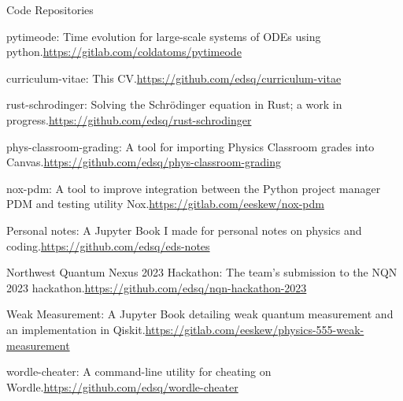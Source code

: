 \begingroup  %

\newcommand{\repo}[3]{\entry*#1: #2\newline\url{#3}}


\begin{rubric}{Code Repositories}



    \repo{pytimeode}
        {Time evolution for large-scale systems of ODEs using python.}
        {https://gitlab.com/coldatoms/pytimeode}

    \repo{curriculum-vitae}
        {This CV.}
        {https://github.com/edsq/curriculum-vitae}

    \repo{rust-schrodinger}
        {Solving the Schr\"{o}dinger equation in Rust; a work in progress.}
        {https://github.com/edsq/rust-schrodinger}

    \repo{phys-classroom-grading}
        {A tool for importing Physics Classroom grades into Canvas.}
        {https://github.com/edsq/phys-classroom-grading}

    \repo{nox-pdm}
        {A tool to improve integration between the Python project manager PDM
        and testing utility Nox.}
        {https://gitlab.com/eeskew/nox-pdm}

    \repo{Personal notes}
        {A Jupyter Book I made for personal notes on physics and coding.}
        {https://github.com/edsq/eds-notes}

    \repo{Northwest Quantum Nexus 2023 Hackathon}
        {The \smc{WSU} team's submission to the NQN 2023 hackathon.}
        {https://github.com/edsq/nqn-hackathon-2023}

    \repo{Weak Measurement}
        {A Jupyter Book detailing weak quantum measurement and an
        implementation in Qiskit.}
        {https://gitlab.com/eeskew/physics-555-weak-measurement}

    \repo{wordle-cheater}
        {A command-line utility for cheating on Wordle.}
        {https://github.com/edsq/wordle-cheater}
\end{rubric}

\endgroup

